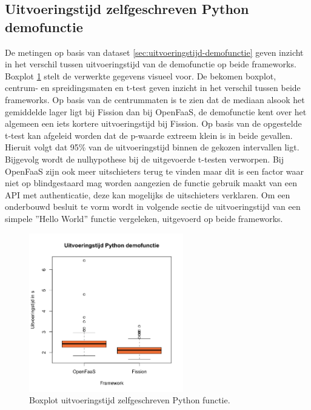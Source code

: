 \subsection{Uitvoeringstijd zelfgeschreven Python demofunctie}
De metingen op basis van dataset \ref{sec:uitvoeringstijd-demofunctie} geven inzicht in het verschil tussen uitvoeringstijd van de demofunctie op beide frameworks. Boxplot \ref{fig:boxplot-demo-functie} stelt de verwerkte gegevens visueel voor. De bekomen boxplot, centrum- en spreidingsmaten en t-test geven inzicht in het verschil tussen beide frameworks. Op  basis van de centrummaten is te zien dat de mediaan alsook het gemiddelde lager ligt bij Fission dan bij OpenFaaS, de demofunctie kent over het algemeen een iets kortere uitvoeringstijd bij Fission. Op basis van de opgestelde t-test kan afgeleid worden dat de p-waarde extreem klein is in beide gevallen. Hieruit volgt dat 95\% van de uitvoeringstijd binnen de gekozen intervallen ligt. Bijgevolg wordt de nulhypothese bij de uitgevoerde t-testen verworpen. Bij OpenFaaS zijn ook meer uitschieters terug te vinden maar dit is een factor waar niet op blindgestaard mag worden aangezien de functie gebruik maakt van een API met authenticatie, deze kan mogelijks de uitschieters verklaren. Om een onderbouwd besluit te vorm wordt in volgende sectie de uitvoeringstijd van een simpele ''Hello World'' functie vergeleken, uitgevoerd op beide frameworks.
\begin{figure}
    \centering
    \includegraphics[width=0.6\textwidth]{img/boxplot-uitvoeringstijd-demofunctie.png}
    \caption{Boxplot uitvoeringstijd zelfgeschreven Python functie.}
    \label{fig:boxplot-demo-functie}
\end{figure}

